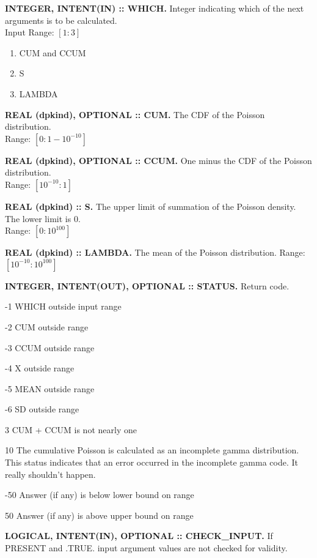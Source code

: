 \documentclass[12pt,dvips]{article}
\newcommand{\range}[2]{\hfill Range: \ensuremath{\left[ #1:#2
\right]}\\}
\newcommand{\inrange}[2]{\hfill Input Range: \ensuremath{\left[ #1:#2
\right]}\\}
\newcommand{\sprob}{10^{-10}}
\newcommand{\bprob}{1-\sprob}
\newcommand{\immense}{10^{100}}
\newcommand{\myitem}[1]{\item{\bf \color{Violet} #1 \normalcolor}}
\begin{document}
\begin{description}

\myitem{INTEGER, INTENT(IN)  :: WHICH.} Integer indicating  which of the
next arguments is to be calculated.\\
\inrange{1}{3}
\begin{enumerate}
\item CUM and CCUM
\item S
\item LAMBDA
\end{enumerate}

\myitem{REAL  (dpkind), OPTIONAL ::  CUM.} The  CDF of  the Poisson
distribution.\\
\range{0}{\bprob}

\myitem{REAL (dpkind), OPTIONAL :: CCUM.} One minus the CDF of the
Poisson  distribution.\\
\range{\sprob}{1}

\myitem{REAL  (dpkind) ::  S.}  The  upper limit  of summation  of the
Poisson density.     The     lower     limit    is     $0$.\\
\range{0}{\immense}

\myitem{REAL (dpkind) :: LAMBDA.} The mean of the Poisson
distribution.
\range{\sprob}{\immense}

\myitem{INTEGER, INTENT(OUT), OPTIONAL :: STATUS.} Return code.
\begin{description}
\item{-1}  WHICH outside input range
\item{-2}  CUM outside range
\item{-3}  CCUM outside range
\item{-4}  X outside range
\item{-5}  MEAN outside range
\item{-6}  SD outside range
\item{3} CUM + CCUM is not nearly one
\item{10} The cumulative Poisson is calculated as an incomplete
gamma distribution.  This status indicates that an error occurred
in the incomplete gamma code.  It really shouldn't happen.
\item{-50} Answer (if any) is below lower bound on range
\item{50} Answer (if any) is above upper bound on range
\end{description}


\myitem{LOGICAL, INTENT(IN), OPTIONAL :: CHECK\_INPUT.}  If PRESENT
and .TRUE. input argument values are not checked for validity.

\end{description}
\end{document}

